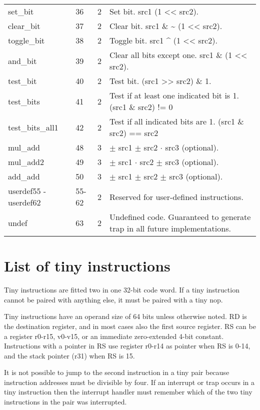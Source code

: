 \documentclass[forwardcom.tex]{subfiles}
\begin{document}
\begin{longtable} {|p{18mm}|p{9mm}|p{9mm}|p{76mm}|}
set\_bit     & 36 & 2 & Set bit. src1 \textbar{} (1 \textless\textless{} src2). \\
clear\_bit   & 37 & 2 & Clear bit. src1 \& \~{} (1 \textless\textless{} src2). \\
toggle\_bit  & 38 & 2 & Toggle bit. src1 \^{} (1 \textless\textless{} src2). \\
and\_bit     & 39 & 2 & Clear all bits except one. src1 \&{} (1 \textless\textless{} src2). \\
test\_bit    & 40 & 2 & Test bit. (src1 \textgreater\textgreater{} src2) \& 1. \\
test\_bits   & 41 & 2 & Test if at least one indicated bit is 1. (src1 \& src2) != 0 \\
test\_bits\_all1 & 42 & 2 & Test if all indicated bits are 1. (src1 \& src2) == src2 \\
mul\_add     & 48 & 3 & $\pm$ src1 $\pm$ src2 $\cdot$ src3 (optional). \\
mul\_add2    & 49 & 3 & $\pm$ src1 $\cdot$ src2 $\pm$ src3 (optional). \\
add\_add     & 50 & 3 & $\pm$ src1 $\pm$ src2 $\pm$ src3 (optional). \\
userdef55 - userdef62
             & 55-62 & 2 & Reserved for user-defined instructions. \\
undef        & 63 & 2 & Undefined code. Guaranteed to generate trap in all future implementations. \\
\hline
\end{longtable}


\section{List of tiny instructions}
Tiny instructions are fitted two in one 32-bit code word. If a tiny instruction cannot be paired with anything else, it must be paired with a tiny nop.
\vspace{2mm}

Tiny instructions have an operand size of 64 bits unless otherwise noted. RD is the destination register, and in most cases also the first source register. RS can be a register r0-r15, v0-v15, or an immediate zero-extended 4-bit constant. Instructions with a pointer in RS use register r0-r14 as pointer when RS is 0-14, and the stack pointer (r31) when RS is 15.
\vspace{2mm}

It is not possible to jump to the second instruction in a tiny pair because instruction addresses must be divisible by four. If an interrupt or trap occurs in a tiny instruction then the interrupt handler must remember which of the two tiny instructions in the pair was interrupted.
\end{document}
